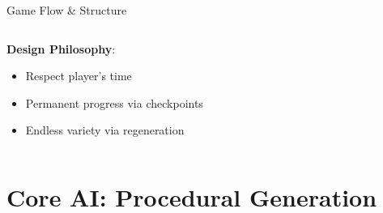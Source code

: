 \documentclass{beamer}
\begin{document}
\begin{frame}{Game Flow \& Structure}
\begin{columns}[T]
\begin{column}{0.48\textwidth}
            \vspace{0.3cm}
            \textbf{Design Philosophy}:
            \begin{itemize}
                \item Respect player's time
                \item Permanent progress via checkpoints
                \item Endless variety via regeneration
            \end{itemize}
        \end{column}
    \end{columns}
\end{frame}

\section{Core AI: Procedural Generation}
\end{document}
